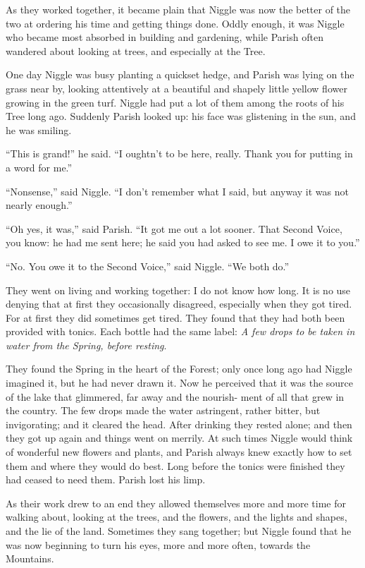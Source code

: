 \documentclass[english]{scrartcl}
\begin{document}
As they worked together, it became plain that Niggle was now the better of the two at ordering his time and getting things done. Oddly enough, it was Niggle who became most absorbed in building and gardening, while Parish often wandered about looking at trees, and especially at the Tree.

One day Niggle was busy planting a quickset hedge, and Parish was lying on the grass near by, looking attentively at a beautiful and shapely little yellow flower growing in the green turf. Niggle had put a lot of them among the roots of his Tree long ago. Suddenly Parish looked up: his face was glistening in the sun, and he was smiling.

“This is grand!” he said. “I oughtn’t to be here, really. Thank you for putting in a word for me.”

“Nonsense,” said Niggle. “I don’t remember what I said, but anyway it was not nearly enough.”

“Oh yes, it was,” said Parish. “It got me out a lot sooner. That Second Voice, you know: he had me sent here; he said you had asked to see me. I owe it to you.”

“No. You owe it to the Second Voice,” said Niggle. “We both do.”

They went on living and working together: I do not know how long. It is no use denying that at first they occasionally disagreed, especially when they got tired. For at first they did sometimes get tired. They found that they had both been provided with tonics. Each bottle had the same label: \emph{A few drops to be taken in water from the Spring, before resting}.

They found the Spring in the heart of the Forest; only once long ago had Niggle imagined it, but he had never drawn it. Now he perceived that it was the source of the lake that glimmered, far away and the nourish- ment of all that grew in the country. The few drops made the water astringent, rather bitter, but invigorating; and it cleared the head. After drinking they rested alone; and then they got up again and things went on merrily. At such times Niggle would think of wonderful new flowers and plants, and Parish always knew exactly how to set them and where they would do best. Long before the tonics were finished they had ceased to need them. Parish lost his limp.

As their work drew to an end they allowed themselves more and more time for walking about, looking at the trees, and the flowers, and the lights and shapes, and the lie of the land. Sometimes they sang together; but Niggle found that he was now beginning to turn his eyes, more and more often, towards the Mountains.
\end{document}
